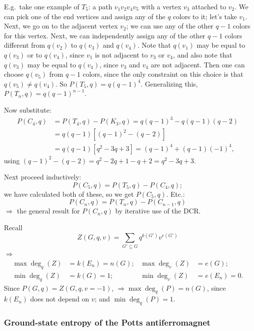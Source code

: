 E.g.\ take one example of $T_5$: a path $v_1v_2v_4v_5$ with a vertex $v_3$ attached to $v_2$.
We can pick one of the end vertices and assign any of the $q$ colors to it; let's take $v_1$.
Next, we go on to the adjacent vertex $v_2$; we can use any of the other $q-1$ colors for this
vertex. Next, we can independently assign any of the other $q-1$ colors different from
$q(v_2)$ to $q(v_3)$ and $q(v_4)$. Note that $q(v_1)$ may be equal to $q(v_3)$ or to $q(v_4)$,
since $v_1$ is not adjacent to $v_3$ or $v_4$, and also note that $q(v_3)$ may be equal to
$q(v_4)$, since $v_3$ and $v_4$ are not adjacent. Then one can choose $q(v_5)$ from $q-1$
colors, since the only constraint on this choice is that $q(v_5)\ne q(v_4)$. So
$P(T_5,q) = q(q-1)^4$. Generalizing this, $P(T_n,q) = q(q-1)^{n-1}$.

Now substitute:
\begin{align}
  P(C_4,q) &= P(T_4,q) - P(K_3,q) = q(q-1)^3 - q(q-1)(q-2)\nonumber\\
           &= q(q-1)\left[(q-1)^2-(q-2)\right]\nonumber\\
           &= q(q-1)\left[q^2-3q+3\right] = (q-1)^4 + (q-1)(-1)^4 ,
\end{align}
using $(q-1)^2-(q-2) = q^2-2q+1-q+2 = q^2-3q+3$.

Next proceed inductively:
\begin{equation}
  P(C_5,q) = P(T_5,q) - P(C_4,q);
\end{equation}
we have calculated both of these, so we get $P(C_5,q)$. Etc.:
\begin{equation}
  P(C_n,q) = P(T_n,q) - P(C_{n-1},q)
\end{equation}
$\Rightarrow$ the general result for $P(C_n,q)$ by iterative use of the DCR.

Recall
\begin{equation}
  Z(G,q,v) = \sum_{G'\subseteq G}q^{k(G')}v^{e(G')}
\end{equation}
$\Rightarrow$
\begin{align*}
  \max\deg_q(Z) &= k(E_n) = n(G); & \max\deg_v(Z) &= e(G);\\
  \min\deg_q(Z) &= k(G) = 1; & \min\deg_v(Z) &= e(E_n) = 0 .
\end{align*}
Since $P(G,q) = Z(G,q,v=-1)$, $\Rightarrow\max\deg_q(P) = n(G)$, since $k(E_n)$ does not
depend on $v$; and $\min\deg_q(P) = 1$.

\subsubsection*{Ground-state entropy of the Potts antiferromagnet}


